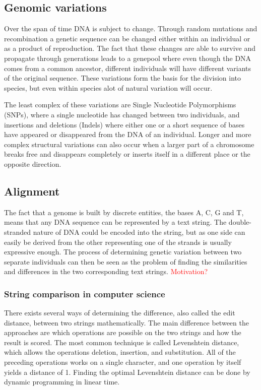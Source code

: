 \documentclass[thesis.tex]{subfiles}
\begin{document}
\subsection{Genomic variations}
Over the span of time DNA is subject to change. Through random mutations and recombination a genetic sequence can be changed either within an individual or as a product of reproduction. The fact that these changes are able to survive and propagate through generations leads to a genepool where even though the DNA comes from a common ancestor, different individuals will have different variants of the original sequence. These variations form the basis for the division into species, but even within species alot of natural variation will occur.\\
\par\noindent
The least complex of these variations are Single Nucleotide Polymorphisms (SNPs), where a single nucleotide has changed between two individuals, and insertions and deletions (Indels) where either one or a short sequence of bases have appeared or disappeared from the DNA of an individual. Longer and more complex structural variations can also occur when a larger part of a chromosome breaks free and disappears completely or inserts itself in a different place or the opposite direction. 
\subsection{Alignment}
The fact that a genome is built by discrete entities, the bases A, C, G and T, means that any DNA sequence can be represented by a text string. The double-stranded nature of DNA could be encoded into the string, but as one side can easily be derived from the other representing one of the strands is usually expressive enough. The process of determining genetic variation between two separate individuals can then be seen as the problem of finding the similarities and differences in the two corresponding text strings. \textcolor{red}{Motivation?}
\subsubsection{String comparison in computer science}
There exists several ways of determining the difference, also called the edit distance, between two strings mathematically. The main difference between the approaches are which operations are possible on the two strings and how the result is scored. The most common technique is called Levenshtein distance, which allows the operations deletion, insertion, and substitution. All of the preceding operations works on a single character, and one operation by itself yields a distance of 1. Finding the optimal Levenshtein distance can be done by dynamic programming in linear time.
\end{document}
